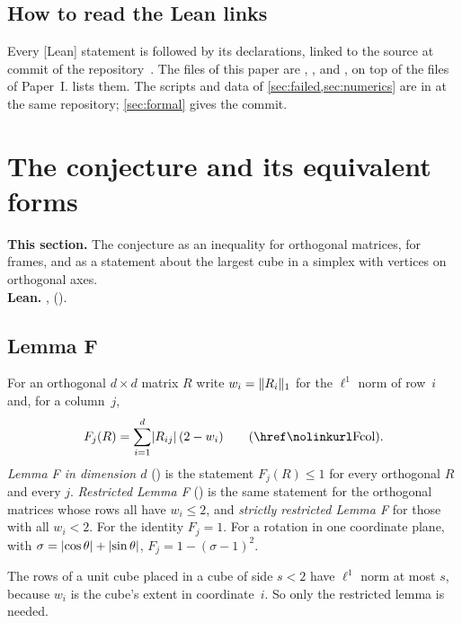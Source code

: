 \documentclass[11pt,a4paper]{article}
\newcommand{\status}[1]{\textsf{\small[#1]}}
\begin{document}
\subsection{How to read the Lean links}
Every \status{Lean} statement is followed by its declarations, linked to the source at commit \href{\repo/tree/\leancommit}{\texttt{\leancommitshort}} of the repository~\cite{archive}. The files of this paper are , ,  and , on top of the files of Paper~I.  lists them. The scripts and data of \cref{sec:failed,sec:numerics} are in  at the same repository; \cref{sec:formal} gives the commit.

\section{The conjecture and its equivalent forms}\label{sec:forms}

\begin{summarybox}
\textbf{This section.} The conjecture as an inequality for orthogonal matrices, for frames, and as a statement about the largest cube in a simplex with vertices on orthogonal axes.\\
\textbf{Lean.} ,  ().
\end{summarybox}

\subsection{Lemma F}
For an orthogonal $d\times d$ matrix $R$ write $w_i=\lVert R_i\rVert_1$ for the $\ell^1$ norm of row~$i$ and, for a column~$j$,
\[
F_j(R)=\sum_{i=1}^d \abs{R_{ij}}\,(2-w_i)
\qquad\text{(\lean{NearAxis}{Fcol})}.
\]
\emph{Lemma F in dimension $d$} () is the statement $F_j(R)\le1$ for every orthogonal $R$ and every $j$. \emph{Restricted Lemma F} () is the same statement for the orthogonal matrices whose rows all have $w_i\le2$, and \emph{strictly restricted Lemma F} for those with all $w_i<2$. For the identity $F_j=1$. For a rotation in one coordinate plane, with $\sigma=\lvert \cos\theta\rvert+\lvert \sin\theta\rvert$, $F_j=1-(\sigma-1)^2$.

The rows of a unit cube placed in a cube of side $s<2$ have $\ell^1$ norm at most $s$, because $w_i$ is the cube's extent in coordinate~$i$. So only the restricted lemma is needed.
\end{document}
